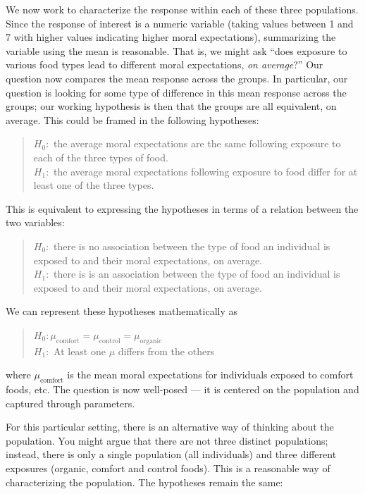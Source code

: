 \documentclass[]{book}
\theoremstyle{definition}
\theoremstyle{definition}
\theoremstyle{definition}
\theoremstyle{remark}
\begin{document}
We now work to characterize the response within each of these three
populations. Since the response of interest is a numeric variable
(taking values between 1 and 7 with higher values indicating higher
moral expectations), summarizing the variable using the mean is
reasonable. That is, we might ask ``does exposure to various food types
lead to different moral expectations, \emph{on average}?'' Our question
now compares the mean response across the groups. In particular, our
question is looking for some type of difference in this mean response
across the groups; our working hypothesis is then that the groups are
all equivalent, on average. This could be framed in the following
hypotheses:

\begin{quote}
\(H_0:\) the average moral expectations are the same following exposure
to each of the three types of food.\\
\(H_1:\) the average moral expectations following exposure to food
differ for at least one of the three types.
\end{quote}

This is equivalent to expressing the hypotheses in terms of a relation
between the two variables:

\begin{quote}
\(H_0:\) there is no association between the type of food an individual
is exposed to and their moral expectations, on average.\\
\(H_1:\) there is is an association between the type of food an
individual is exposed to and their moral expectations, on average.
\end{quote}

We can represent these hypotheses mathematically as

\begin{quote}
\(H_0: \mu_{\text{comfort}} = \mu_{\text{control}} = \mu_{\text{organic}}\)\\
\(H_1:\) At least one \(\mu\) differs from the others
\end{quote}

where \(\mu_{\text{comfort}}\) is the mean moral expectations for
individuals exposed to comfort foods, etc. The question is now
well-posed --- it is centered on the population and captured through
parameters.

For this particular setting, there is an alternative way of thinking
about the population. You might argue that there are not three distinct
populations; instead, there is only a single population (all
individuals) and three different exposures (organic, comfort and control
foods). This is a reasonable way of characterizing the population. The
hypotheses remain the same:
\end{document}
